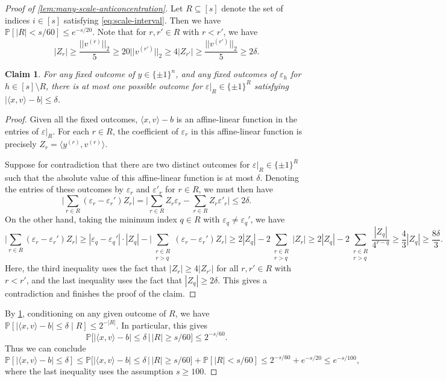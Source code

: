 \documentclass[reqno]{amsart}
\newtheorem{claim}[theorem]{Claim}
\theoremstyle{remark}
\theoremstyle{definition}
\numberwithin{theorem}{section}
\renewcommand{\(}{\bigl(}
\renewcommand{\)}{\bigr)\vphantom{)}}
\newcommand{\eps}{\varepsilon}
\renewcommand{\le}{\leqslant}
\renewcommand{\ge}{\geqslant}
\renewcommand{\P}{\mathbb{P}}
\newcommand{\ang}[1]{\langle#1\rangle}
\newcommand{\bin}{\{\pm 1\}}
\begin{document}
\begin{proof}[Proof of \cref{lem:many-scale-anticoncentration}]
Let $R\subseteq [s]$ denote the set of indices $i\in [s]$ satisfying \eqref{eq:scale-interval}. Then we have $\P[|R|<s/60 ]\le e^{-s/20}$. Note that for $r,r'\in R$ with $r < r'$, we have 
\[|Z_r|\ge \frac{||v^{(r)}||_2}{5}\ge 20||v^{(r')}||_2\ge 4|Z_{r'}|\ge \frac{||v^{(r')}||_2}{5} \ge 2\delta.\]

\begin{claim}\label{claim:unique-assignment-many-scale}
    For any fixed outcome of $y\in \bin^n$, and any fixed outcomes of $\eps_h$ for $h\in [s]\setminus R$, there is at most one possible outcome for $\eps|_R\in \bin^R$ satisfying $|\ang{x,v} - b| \le \delta$.
\end{claim}


\begin{proof}
Given all the fixed outcomes, $\ang{x,v}-b$ is an affine-linear function in the entries of $\eps|_R$. For each $r\in R$, the coefficient of $\eps_r$ in this affine-linear function is precisely $Z_r = \ang{y^{(r)}, v^{(r)}}$.

    Suppose for contradiction that there are two distinct outcomes for $\eps|_R\in \bin^R$ such that the absolute value of this affine-linear function is at most $\delta$. Denoting the entries of these outcomes by $\eps_r$ and $\eps'_r$ for $r\in R$, we must then have
    \[\Big|\sum_{r\in R}(\eps_r - \eps_r')Z_r\Big|=\Big|\sum_{r\in R}Z_r\eps_r - \sum_{r\in R}Z_r\eps'_r\Big|\le 2\delta.\]
    On the other hand, taking the minimum index $q\in R$ with $\eps_q\ne \eps_q'$, we have
    \[\Big|\sum_{r\in R}(\eps_r - \eps_r')Z_r\Big|\ge |\eps_q - \eps_q'|\cdot |Z_q|-\Big|\sum_{\substack{r\in R\\r>q}}(\eps_r - \eps_r')Z_r\Big|\ge 2|Z_q|-2\sum_{\substack{r\in R\\r>q}}|Z_r|\ge 2|Z_q|-2\sum_{\substack{r\in R\\r>q}}\frac{|Z_q|}{4^{r-q}}\ge \frac{4}{3}|Z_{q}| \ge \frac{8\delta}{3}.\]
    Here, the third inequality uses the fact that $|Z_r|\ge 4|Z_{r'}|$ for all $r,r'\in R$ with $r < r'$, and the last inequality uses the fact that $|Z_{q}|\ge 2\delta$. This gives a contradiction and finishes the proof of the claim.
\end{proof}

    By \cref{claim:unique-assignment-many-scale}, conditioning on any given outcome of $R$, we have $\P[|\ang{x,v} - b| \le \delta\mid R ]\le 2^{-|R|}$. In particular, this gives
    \[\P\Big[|\ang{x,v} - b| \le \delta \,\Big|\, |R|\ge s/60\Big]\le 2^{-s/60}.\]
    Thus we can conclude 
    \[
        \P[|\ang{x,v} - b|\le \delta]\le \P\Big[|\ang{x,v} - b| \le \delta \,\Big|\, |R|\ge s/60\Big] + \P[|R| < s/60]\le 2^{-s/60} + e^{-s/20} \le e^{-s/100},
    \]
    where the last inequality uses the assumption $s \ge 100$.
\end{proof}
\end{document}
